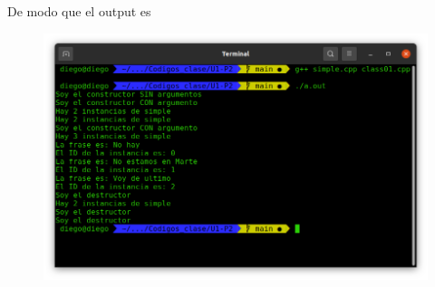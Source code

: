 \begin{enumerate}[1)]
\begin{figure}[H]
		\end{figure}
	De modo que el output es
		\begin{figure}[H]
			\centering
			\includegraphics[scale=0.5]{./img/output.png}
		\end{figure}
\end{enumerate}



